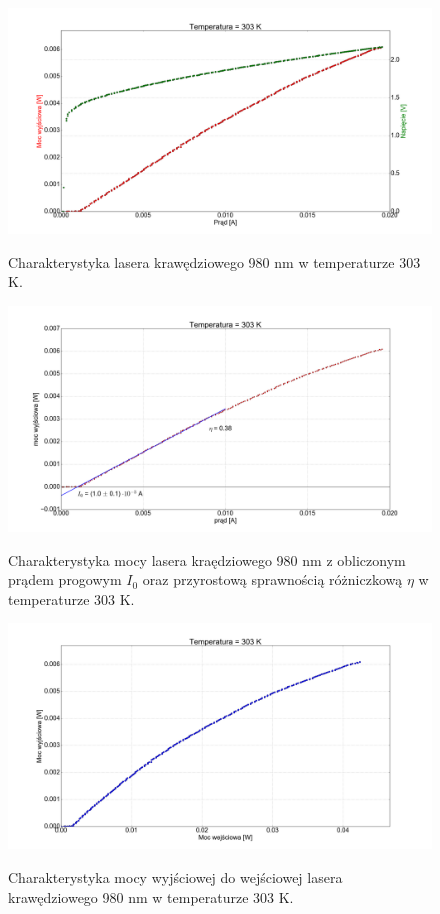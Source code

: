 \documentclass[a4paper, portrait,12pt]{report}
\begin{document}
\begin{figure}
\center
  \includegraphics[scale=0.30]{plot980/temp_30_IVL.png}
  \label{rys1}
  \caption{Charakterystyka lasera krawędziowego 980 nm w temperaturze 303 K.} 
\end{figure}

\begin{figure}
\center
  \includegraphics[scale=0.30]{plot980/temp_30_fit.png}
  \label{rys1}
  \caption{Charakterystyka mocy lasera kraędziowego 980 nm z obliczonym prądem progowym $I_0$ oraz przyrostową sprawnością różniczkową $\eta$ w temperaturze 303 K.} 
\end{figure}


\begin{figure}
\center
  \includegraphics[scale=0.30]{plot980/temp_30_power.png}
  \label{rys1}
  \caption{Charakterystyka mocy wyjściowej do wejściowej lasera krawędziowego 980 nm w temperaturze 303 K.} 
\end{figure}
\end{document}
